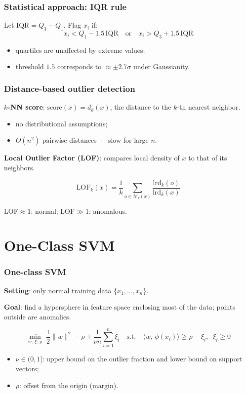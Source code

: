 \documentclass[]{beamer}
\begin{document}
\begin{frame}[fragile]
\frametitle{Statistical approach: IQR rule}
Let $\mathrm{IQR} = Q_3 - Q_1$. Flag $x_i$ if:
\begin{equation*}
x_i < Q_1 - 1.5\,\mathrm{IQR} \quad \text{or} \quad x_i > Q_3 + 1.5\,\mathrm{IQR}
\end{equation*}

\begin{itemize}
  \item quartiles are unaffected by extreme values;
  \item threshold $1.5$ corresponds to $\approx \pm 2.7\sigma$ under Gaussianity.
\end{itemize}

\end{frame}

\begin{frame}[fragile]
\frametitle{Distance-based outlier detection}
\textbf{$k$-NN score}: $\mathrm{score}(x) = d_k(x)$, the distance to the $k$-th nearest neighbor.

\begin{itemize}
  \item no distributional assumptions;
  \item $O(n^2)$ pairwise distances --- slow for large $n$.
\end{itemize}

\textbf{Local Outlier Factor (LOF)}: compares local density of $x$ to that of its neighbors.

\begin{equation*}
\mathrm{LOF}_k(x) = \frac{1}{k}\sum_{o \in \mathcal{N}_k(x)} \frac{\mathrm{lrd}_k(o)}{\mathrm{lrd}_k(x)}
\end{equation*}

$\mathrm{LOF} \approx 1$: normal; $\mathrm{LOF} \gg 1$: anomalous.

\end{frame}

\section{One-Class SVM}

\begin{frame}[fragile]
\frametitle{One-class SVM}
\textbf{Setting}: only normal training data $\{x_1,\dots,x_n\}$.

\textbf{Goal}: find a hypersphere in feature space enclosing most of the data; points outside are anomalies.

\begin{equation*}
\min_{w,\, \xi,\, \rho} \;\frac{1}{2}\|w\|^2 - \rho + \frac{1}{\nu n}\sum_{i=1}^{n}\xi_i
\quad \text{s.t.} \quad
\langle w,\, \phi(x_i)\rangle \geq \rho - \xi_i,\;\; \xi_i \geq 0
\end{equation*}

\begin{itemize}
  \item $\nu \in (0,1]$: upper bound on the outlier fraction and lower bound on support vectors;
  \item $\rho$: offset from the origin (margin).
\end{itemize}

\end{frame}
\end{document}
